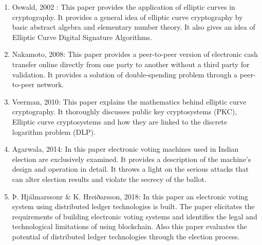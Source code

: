 \documentclass{article}
\begin{document}
\begin{enumerate}
    \item Oswald, 2002 :  This paper provides the application of elliptic curves in cryptography. It provides a general idea of elliptic curve cryptography by basic abstract algebra and elementary number theory. It also gives an idea of Elliptic Curve Digital Signature Algorithms.

\item Nakamoto, 2008:  This paper provides a peer-to-peer version of electronic cash transfer online directly from one party to another without a third party for validation. It provides a solution of double-spending problem through a peer-to-peer network.

\item Veerman, 2010: This paper explains the mathematics behind elliptic curve cryptography. It thoroughly discusses public key cryptosystems (PKC), Elliptic
curve cryptosystems and how they are linked to the discrete
logarithm problem (DLP). 

\item Agarwala, 2014: In this paper electronic voting machines used in Indian election are exclusively examined. It provides a 
description of the machine’s design and operation in detail. 
It throws a light on the serious attacks that can alter election results and
violate the secrecy of the ballot. 

\item Þ. Hjálmarssonr & K. Hreiðarsson, 2018: In this paper an electronic voting system using distributed ledger technologies is built. The paper elicitates the requirements of building electronic voting systems and identifies the legal and technological
limitations of using blockchain. Also this paper evaluates the potential of distributed ledger technologies
through the election process. 



\end{enumerate}
\end{document}
